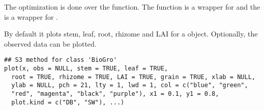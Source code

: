 \documentclass[letterpaper]{book}
\begin{document}
%
\begin{Details}\relax
The optimization is done over the 
function. The  function is a wrapper for
 and the  is a wrapper for
.
\end{Details}
%
\begin{Description}\relax
By default it plots stem, leaf, root, rhizome and LAI for a
 object. Optionally, the observed data can be
plotted.
\end{Description}
%
\begin{Usage}
\begin{verbatim}
## S3 method for class 'BioGro'
plot(x, obs = NULL, stem = TRUE, leaf = TRUE,
  root = TRUE, rhizome = TRUE, LAI = TRUE, grain = TRUE, xlab = NULL,
  ylab = NULL, pch = 21, lty = 1, lwd = 1, col = c("blue", "green",
  "red", "magenta", "black", "purple"), x1 = 0.1, y1 = 0.8,
  plot.kind = c("DB", "SW"), ...)
\end{verbatim}
\end{Usage}
%
\end{document}
